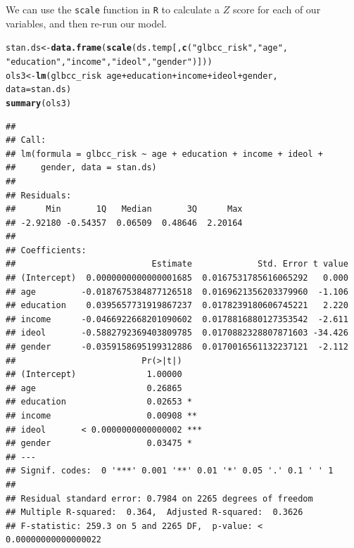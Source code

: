 \documentclass[11pt,openany]{book}\usepackage[]{graphicx}\usepackage[]{color}
\makeatletter
\newcommand{\hlstr}[1]{\textcolor[rgb]{0.192,0.494,0.8}{#1}}%
\newcommand{\hlopt}[1]{\textcolor[rgb]{0,0,0}{#1}}%
\newcommand{\hlstd}[1]{\textcolor[rgb]{0.345,0.345,0.345}{#1}}%
\newcommand{\hlkwb}[1]{\textcolor[rgb]{0.69,0.353,0.396}{#1}}%
\newcommand{\hlkwc}[1]{\textcolor[rgb]{0.333,0.667,0.333}{#1}}%
\newcommand{\hlkwd}[1]{\textcolor[rgb]{0.737,0.353,0.396}{\textbf{#1}}}%
\newenvironment{kframe}{%
 \def\at@end@of@kframe{}%
 \ifinner\ifhmode%
  \def\at@end@of@kframe{\end{minipage}}%
  \begin{minipage}{\columnwidth}%
 \fi\fi%
 \def\FrameCommand##1{\hskip\@totalleftmargin \hskip-\fboxsep
 \colorbox{shadecolor}{##1}\hskip-\fboxsep
     \hskip-\linewidth \hskip-\@totalleftmargin \hskip\columnwidth}%
 \MakeFramed {\advance\hsize-\width
   \@totalleftmargin\z@ \linewidth\hsize
   \@setminipage}}%
 {\par\unskip\endMakeFramed%
 \at@end@of@kframe}
\newenvironment{knitrout}{}{} %
\renewenvironment{knitrout}{\begin{singlespace}}{\end{singlespace}} %
\makeatother
\begin{document}
We can use the \texttt{scale} function in \texttt{R} to calculate a $Z$ score for each of our variables, and then re-run our model. 
\begin{knitrout}
\color{fgcolor}\begin{kframe}
\begin{alltt}
\hlstd{stan.ds} \hlkwb{<-} \hlkwd{data.frame}\hlstd{(}\hlkwd{scale}\hlstd{(ds.temp[,} \hlkwd{c}\hlstd{(}\hlstr{"glbcc_risk"}\hlstd{,} \hlstr{"age"}\hlstd{,}
    \hlstr{"education"}\hlstd{,} \hlstr{"income"}\hlstd{,} \hlstr{"ideol"}\hlstd{,} \hlstr{"gender"}\hlstd{)]))}
\hlstd{ols3} \hlkwb{<-} \hlkwd{lm}\hlstd{(glbcc_risk} \hlopt{~} \hlstd{age} \hlopt{+} \hlstd{education} \hlopt{+} \hlstd{income} \hlopt{+} \hlstd{ideol} \hlopt{+} \hlstd{gender,}
    \hlkwc{data} \hlstd{= stan.ds)}
\hlkwd{summary}\hlstd{(ols3)}
\end{alltt}
\begin{verbatim}
## 
## Call:
## lm(formula = glbcc_risk ~ age + education + income + ideol + 
##     gender, data = stan.ds)
## 
## Residuals:
##      Min       1Q   Median       3Q      Max 
## -2.92180 -0.54357  0.06509  0.48646  2.20164 
## 
## Coefficients:
##                           Estimate             Std. Error t value
## (Intercept)  0.0000000000000001685  0.0167531785616065292   0.000
## age         -0.0187675384877126518  0.0169621356203379960  -1.106
## education    0.0395657731919867237  0.0178239180606745221   2.220
## income      -0.0466922668201090602  0.0178816880127353542  -2.611
## ideol       -0.5882792369403809785  0.0170882328807871603 -34.426
## gender      -0.0359158695199312886  0.0170016561132237121  -2.112
##                         Pr(>|t|)    
## (Intercept)              1.00000    
## age                      0.26865    
## education                0.02653 *  
## income                   0.00908 ** 
## ideol       < 0.0000000000000002 ***
## gender                   0.03475 *  
## ---
## Signif. codes:  0 '***' 0.001 '**' 0.01 '*' 0.05 '.' 0.1 ' ' 1
## 
## Residual standard error: 0.7984 on 2265 degrees of freedom
## Multiple R-squared:  0.364,	Adjusted R-squared:  0.3626 
## F-statistic: 259.3 on 5 and 2265 DF,  p-value: < 0.00000000000000022
\end{verbatim}
\end{kframe}
\end{knitrout}
\end{document}
